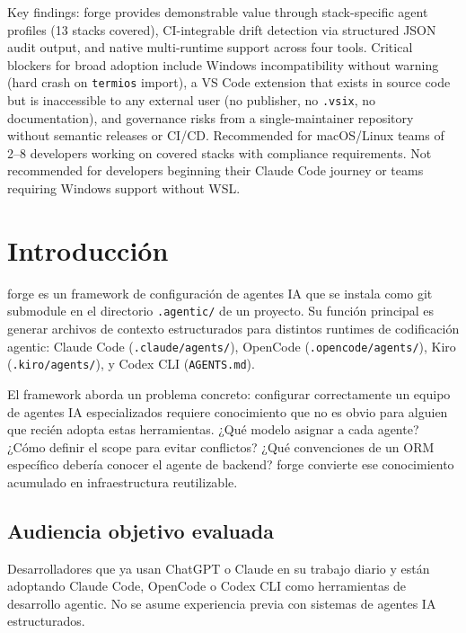 \documentclass[11pt,a4paper]{article}
\begin{document}
Key findings: forge provides demonstrable value through stack-specific agent profiles (13 stacks covered), CI-integrable drift detection via structured JSON audit output, and native multi-runtime support across four tools. Critical blockers for broad adoption include Windows incompatibility without warning (hard crash on \texttt{termios} import), a VS Code extension that exists in source code but is inaccessible to any external user (no publisher, no \texttt{.vsix}, no documentation), and governance risks from a single-maintainer repository without semantic releases or CI/CD. Recommended for macOS/Linux teams of 2--8 developers working on covered stacks with compliance requirements. Not recommended for developers beginning their Claude Code journey or teams requiring Windows support without WSL.

\tableofcontents
\newpage

\section{Introducción}

forge es un framework de configuración de agentes IA que se instala como git submodule en el directorio \texttt{.agentic/} de un proyecto. Su función principal es generar archivos de contexto estructurados para distintos runtimes de codificación agentic: Claude Code (\texttt{.claude/agents/}), OpenCode (\texttt{.opencode/agents/}), Kiro (\texttt{.kiro/agents/}), y Codex CLI (\texttt{AGENTS.md}).

El framework aborda un problema concreto: configurar correctamente un equipo de agentes IA especializados requiere conocimiento que no es obvio para alguien que recién adopta estas herramientas. ¿Qué modelo asignar a cada agente? ¿Cómo definir el scope para evitar conflictos? ¿Qué convenciones de un ORM específico debería conocer el agente de backend? forge convierte ese conocimiento acumulado en infraestructura reutilizable.

\subsection*{Audiencia objetivo evaluada}

Desarrolladores que ya usan ChatGPT o Claude en su trabajo diario y están adoptando Claude Code, OpenCode o Codex CLI como herramientas de desarrollo agentic. No se asume experiencia previa con sistemas de agentes IA estructurados.
\end{document}
